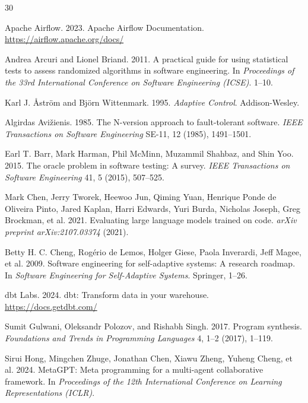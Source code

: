 \documentclass[sigconf,nonacm]{acmart}
\begin{document}

\begin{thebibliography}{30}

Apache Airflow. 2023.
Apache Airflow Documentation.
\url{https://airflow.apache.org/docs/}

Andrea Arcuri and Lionel Briand. 2011.
A practical guide for using statistical tests to assess randomized algorithms in software engineering.
In \textit{Proceedings of the 33rd International Conference on Software Engineering (ICSE)}. 1--10.

Karl J. Åström and Björn Wittenmark. 1995.
\textit{Adaptive Control}.
Addison-Wesley.

Algirdas Avižienis. 1985.
The N-version approach to fault-tolerant software.
\textit{IEEE Transactions on Software Engineering} SE-11, 12 (1985), 1491--1501.

Earl T. Barr, Mark Harman, Phil McMinn, Muzammil Shahbaz, and Shin Yoo. 2015.
The oracle problem in software testing: A survey.
\textit{IEEE Transactions on Software Engineering} 41, 5 (2015), 507--525.

Mark Chen, Jerry Tworek, Heewoo Jun, Qiming Yuan, Henrique Ponde de Oliveira Pinto, Jared Kaplan, Harri Edwards, Yuri Burda, Nicholas Joseph, Greg Brockman, et al. 2021.
Evaluating large language models trained on code.
\textit{arXiv preprint arXiv:2107.03374} (2021).

Betty H. C. Cheng, Rogério de Lemos, Holger Giese, Paola Inverardi, Jeff Magee, et al. 2009.
Software engineering for self-adaptive systems: A research roadmap.
In \textit{Software Engineering for Self-Adaptive Systems}. Springer, 1--26.

dbt Labs. 2024.
dbt: Transform data in your warehouse.
\url{https://docs.getdbt.com/}

Sumit Gulwani, Oleksandr Polozov, and Rishabh Singh. 2017.
Program synthesis.
\textit{Foundations and Trends in Programming Languages} 4, 1--2 (2017), 1--119.

Sirui Hong, Mingchen Zhuge, Jonathan Chen, Xiawu Zheng, Yuheng Cheng, et al. 2024.
MetaGPT: Meta programming for a multi-agent collaborative framework.
In \textit{Proceedings of the 12th International Conference on Learning Representations (ICLR)}.


\end{thebibliography}
\end{document}
